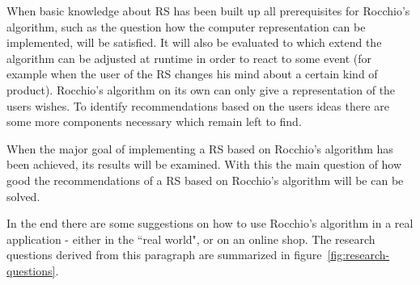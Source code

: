 When basic knowledge about RS has been built up all prerequisites for Rocchio's algorithm, such as the question how the computer representation can be implemented, will be satisfied.
It will also be evaluated to which extend the algorithm can be adjusted at runtime in order to react to some event (for example when the user of the RS changes his mind about a certain kind of product).
Rocchio's algorithm on its own can only give a representation of the users wishes.
To identify recommendations based on the users ideas there are some more components necessary which remain left to find.

When the major goal of implementing a RS based on Rocchio's algorithm has been achieved, its results will be examined.
With this the main question of how good the recommendations of a RS based on Rocchio's algorithm will be can be solved.

In the end there are some suggestions on how to use Rocchio's algorithm in a real application - either in the ``real world", or on an online shop.
The research questions derived from this paragraph are summarized in figure~\ref{fig:research-questions}.



